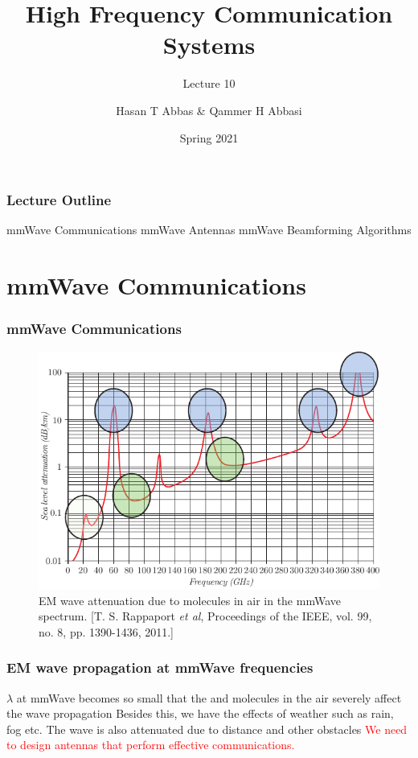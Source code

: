 \documentclass[10pt]{beamer}
\title{High Frequency Communication Systems}
\subtitle{Lecture 10}
\date{Spring 2021}
\author{Hasan T Abbas \& Qammer H Abbasi}
\begin{document}
\maketitle

\begin{frame}[fragile]
    \frametitle{Lecture Outline}
    \begin{outline}[itemize]
        \1 mmWave Communications
        \1 mmWave Antennas
        \1 mmWave Beamforming Algorithms
    \end{outline}
\end{frame}

\section{mmWave Communications}


\begin{frame}
    \frametitle{mmWave Communications}

    \begin{figure}[h!]
        \centering
        \includegraphics[width=.9\textwidth]{atmosphere.pdf}
        \caption{EM wave attenuation due to  molecules in air in the mmWave spectrum. \tiny{[T. S. Rappaport \textit{et al},  Proceedings of the IEEE, vol. 99, no. 8, pp. 1390-1436, 2011.]}}
    \end{figure}

\end{frame}

\begin{frame}
    \frametitle{EM wave propagation at mmWave frequencies}
    \normalsize
    \begin{outline}
        \1 $\lambda$ at mmWave becomes so small that the  and  molecules in the air severely affect the wave propagation
        \1 Besides this, we have the effects of weather such as rain, fog etc.
        \2 The wave is also attenuated due to distance and other obstacles
        \1 \textcolor{red}{We need to design antennas that perform effective communications.}
    \end{outline}
\end{frame}
\end{document}
